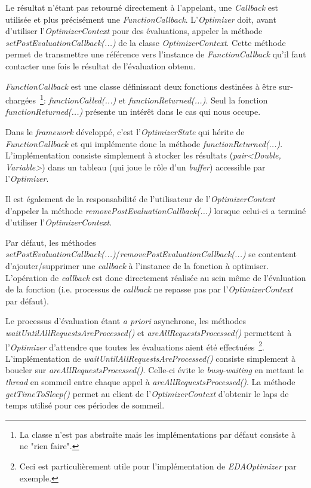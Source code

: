 \documentclass[a4paper, 11pt]{report}
\begin{document}
Le résultat n'étant pas retourné directement à l'appelant, une \textit{Callback} est utilisée et plus précisément une \textit{FunctionCallback}. L'\textit{Optimizer} doit, avant d'utiliser l'\textit{OptimizerContext} pour des évaluations, appeler la méthode \textit{setPostEvaluationCallback(...)} de la classe \textit{OptimizerContext}. Cette méthode permet de transmettre une référence vers l'instance de \textit{FunctionCallback} qu'il faut contacter une fois le résultat de l'évaluation obtenu. 

\textit{FunctionCallback} est une classe définissant deux fonctions destinées à être sur-chargées~\footnote{La classe n'est pas abstraite mais les implémentations par défaut consiste à ne "rien faire".}: \textit{functionCalled(...)} et \textit{functionReturned(...)}. Seul la fonction \textit{functionReturned(...)} présente un intérêt dans le cas qui nous occupe.

Dans le \textit{framework} développé, c'est l'\textit{OptimizerState} qui hérite de \textit{FunctionCallback} et qui implémente donc la méthode \textit{functionReturned(...)}. L'implémentation consiste simplement à stocker les résultats (\textit{pair<Double, Variable>}) dans un tableau (qui joue le rôle d'un \textit{buffer}) accessible par l'\textit{Optimizer}.

Il est également de la responsabilité de l'utilisateur de l'\textit{OptimizerContext} d'appeler la méthode \textit{removePostEvaluationCallback(...)} lorsque celui-ci a terminé d'utiliser l'\textit{OptimizerContext}.

Par défaut, les méthodes \textit{setPostEvaluationCallback(...)}/\textit{removePostEvaluationCallback(...)} se contentent d'ajouter/supprimer une \textit{callback} à l'instance de la fonction à optimiser. L'opération de \textit{callback} est donc directement réalisée au sein même de l'évaluation de la fonction (i.e. processus de \textit{callback} ne repasse pas par l'\textit{OptimizerContext} par défaut).

Le processus d'évaluation étant \textit{a priori} asynchrone, les méthodes \textit{waitUntilAllRequestsAreProcessed()} et \textit{areAllRequestsProcessed()} permettent à l'\textit{Optimizer} d'attendre que toutes les évaluations aient été effectuées~\footnote{Ceci est particulièrement utile pour l'implémentation de \textit{EDAOptimizer} par exemple.}. L'implémentation de \textit{waitUntilAllRequestsAreProcessed()} consiste simplement à boucler sur \textit{areAllRequestsProcessed()}. Celle-ci évite le \textit{busy-waiting} en mettant le \textit{thread} en sommeil entre chaque appel à \textit{areAllRequestsProcessed()}. La méthode \textit{getTimeToSleep()} permet au client de l'\textit{OptimizerContext} d'obtenir le laps de temps utilisé pour ces périodes de sommeil.
\end{document}
